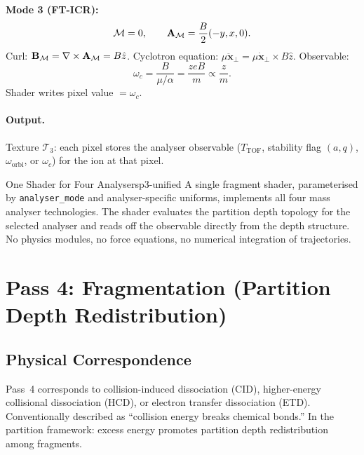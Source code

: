 \textbf{Mode 3 (FT-ICR):}
\begin{equation}
  \mathcal{M} = 0, \qquad \mathbf{A}_{\mathcal{M}} = \frac{B}{2}(-y, x, 0).
\end{equation}
Curl: $\mathbf{B}_{\mathcal{M}} = \nabla\times\mathbf{A}_{\mathcal{M}} = B\hat{z}$.  Cyclotron
equation: $\mu\ddot{\mathbf{x}}_\perp = \mu\dot{\mathbf{x}}_\perp\times
B\hat{z}$.  Observable:
\begin{equation}
  \omega_c = \frac{B}{\mu/\alpha} = \frac{zeB}{m} \propto \frac{z}{m}.
\end{equation}
Shader writes pixel value $= \omega_c$.

\paragraph{Output.}
Texture $\mathcal{T}_3$: each pixel stores the analyser observable
($T_{\mathrm{TOF}}$, stability flag $(a,q)$, $\omega_{\mathrm{orbi}}$, or
$\omega_c$) for the ion at that pixel.

\begin{consequence}{One Shader for Four Analysers}{p3-unified}
  A single fragment shader, parameterised by \texttt{analyser\_mode} and
  analyser-specific uniforms, implements all four mass analyser technologies.
  The shader evaluates the partition depth topology for the selected analyser
  and reads off the observable directly from the depth structure.  No physics
  modules, no force equations, no numerical integration of trajectories.
\end{consequence}

\section{Pass 4: Fragmentation (Partition Depth Redistribution)}
\label{sec:ch22-pass4}

\subsection{Physical Correspondence}

Pass~4 corresponds to collision-induced dissociation (CID), higher-energy
collisional dissociation (HCD), or electron transfer dissociation (ETD).
Conventionally described as ``collision energy breaks chemical bonds.''
In the partition framework: excess energy promotes partition depth
redistribution among fragments.

